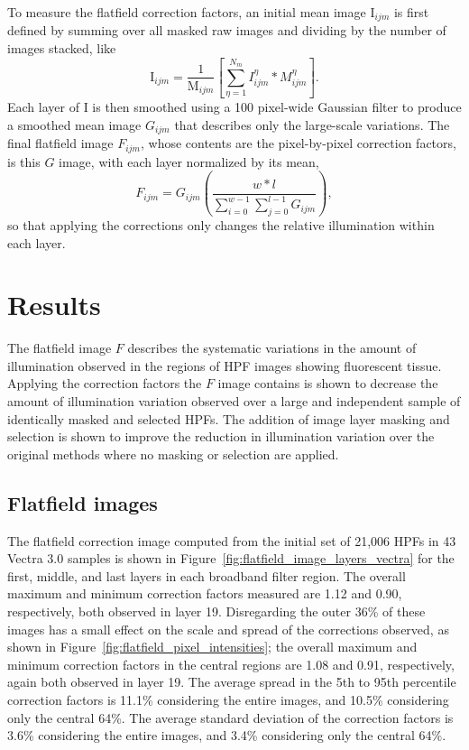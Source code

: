\documentclass[letterpaper,11pt]{article}
\newcommand{\reffig}[1]{Figure~\ref{#1}}
\newcommand{\Iota}{\mathrm{I}}
\newcommand{\Mu}{\mathrm{M}}
\begin{document}
To measure the flatfield correction factors, an initial mean image $\Iota_{ijm}$ is first defined by summing over all masked raw images and dividing by the number of images stacked, like
\begin{equation}
\Iota_{ijm} = \frac{1}{\Mu_{ijm}} \left[ \sum_{\eta=1}^{N_{m}} I^{\eta}_{ijm}*M^{\eta}_{ijm} \right] .
\end{equation}
Each layer of $\Iota$ is then smoothed using a 100 pixel-wide Gaussian filter to produce a smoothed mean image $G_{ijm}$ that describes only the large-scale variations. The final flatfield image $F_{ijm}$, whose contents are the pixel-by-pixel correction factors, is this $G$ image, with each layer normalized by its mean,
\begin{equation}
F_{ijm} = G_{ijm} \left( \frac{w*l}{\sum_{i=0}^{w-1}\sum_{j=0}^{l-1}G_{ijm}} \right) ,
\end{equation}
so that applying the corrections only changes the relative illumination within each layer. 

\section{Results}
\label{sec:results}

The flatfield image $F$ describes the systematic variations in the amount of illumination observed in the regions of HPF images showing fluorescent tissue. Applying the correction factors the $F$ image contains is shown to decrease the amount of illumination variation observed over a large and independent sample of identically masked and selected HPFs. The addition of image layer masking and selection is shown to improve the reduction in illumination variation over the original methods where no masking or selection are applied.

\subsection{Flatfield images}
\label{ssec:flatfield_images}

The flatfield correction image computed from the initial set of 21,006 HPFs in 43 Vectra 3.0 samples is shown in \reffig{fig:flatfield_image_layers_vectra} for the first, middle, and last layers in each broadband filter region. The overall maximum and minimum correction factors measured are 1.12 and 0.90, respectively, both observed in layer 19. Disregarding the outer 36\% of these images has a small effect on the scale and spread of the corrections observed, as shown in \reffig{fig:flatfield_pixel_intensities}; the overall maximum and minimum correction factors in the central regions are 1.08 and 0.91, respectively, again both observed in layer 19. The average spread in the 5th to 95th percentile correction factors is 11.1\% considering the entire images, and 10.5\% considering only the central 64\%. The average standard deviation of the correction factors is 3.6\% considering the entire images, and 3.4\% considering only the central 64\%. 
\end{document}
